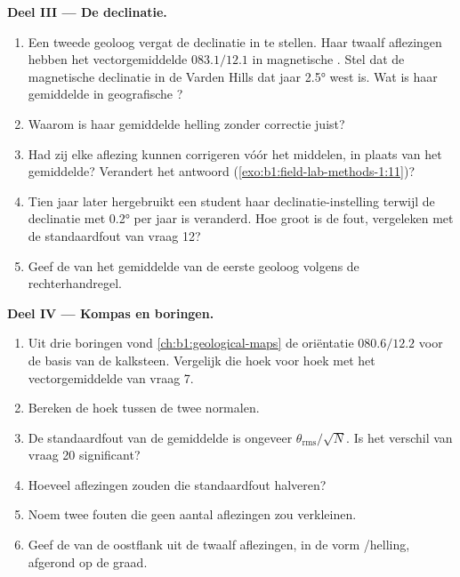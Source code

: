 \begin{problem}
\medskip
\noindent\textbf{Deel III --- De declinatie.}
\begin{enumerate}[resume]
  \item Een tweede geoloog vergat de declinatie in te stellen. Haar twaalf aflezingen hebben het vectorgemiddelde
        $083.1/12.1$ in magnetische . Stel dat de magnetische declinatie in de Varden Hills dat jaar
        \ang{2.5} west is. Wat is haar gemiddelde in geografische ?
  \item Waarom is haar gemiddelde helling zonder correctie juist?
  \item Had zij elke aflezing kunnen corrigeren vóór het middelen, in plaats van het gemiddelde? Verandert het
        antwoord (\cref{exo:b1:field-lab-methods-1:11})?
  \item Tien jaar later hergebruikt een student haar declinatie-instelling terwijl de declinatie met \ang{0.2} per
        jaar is veranderd. Hoe groot is de fout, vergeleken met de standaardfout van vraag 12?
  \item Geef de  van het gemiddelde van de eerste geoloog volgens de rechterhandregel.
\end{enumerate}

\medskip
\noindent\textbf{Deel IV --- Kompas en boringen.}
\begin{enumerate}[resume]
  \item Uit drie boringen vond \cref{ch:b1:geological-maps} de oriëntatie $080.6/12.2$ voor de basis van de kalksteen.
        Vergelijk die hoek voor hoek met het vectorgemiddelde van vraag 7.
  \item Bereken de hoek tussen de twee normalen.
  \item De standaardfout van de gemiddelde  is ongeveer $\theta_{\text{rms}}/\sqrt N$. Is het verschil van
        vraag 20 significant?
  \item Hoeveel aflezingen zouden die standaardfout halveren?
  \item Noem twee fouten die geen aantal aflezingen zou verkleinen.
  \item Geef de  van de oostflank uit de twaalf aflezingen, in de vorm /helling,
        afgerond op de graad.
\end{enumerate}
\end{problem}
